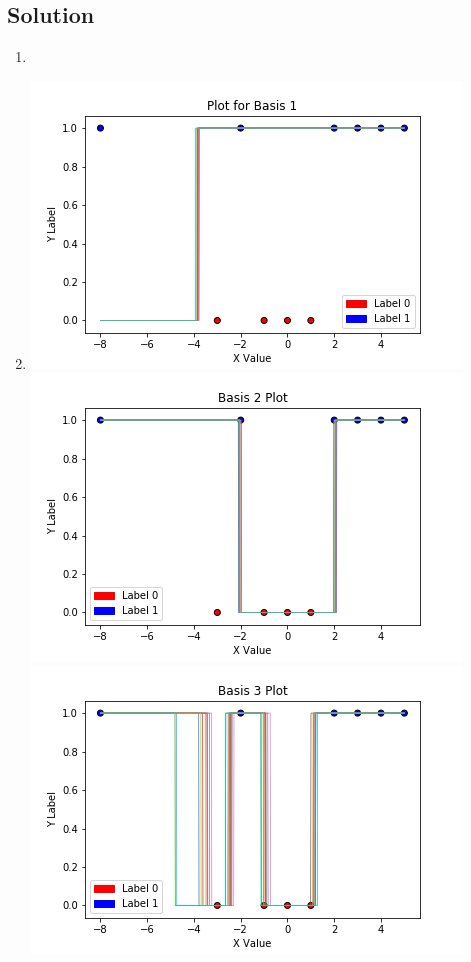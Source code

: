 \documentclass[submit]{harvardml}
\begin{document}
\subsection*{Solution}
\begin{enumerate}
    \item 
    \item \includegraphics[scale=0.6]{Plot for Basis 1.png}
    \includegraphics[scale=0.6]{Basis 2 Plot.png}
    \includegraphics[scale=0.6]{Basis 3 Plot.png}

\end{enumerate}
\end{document}
